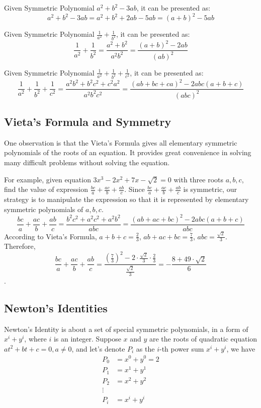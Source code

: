 \documentclass[11pt, oneside]{article}   	%
\begin{document}
Given Symmetric Polynomial $a^2+b^2-3ab$, it can be presented as:
\[a^2+b^2-3ab = a^2+b^2+2ab-5ab=(a+b)^2-5ab\]

Given Symmetric Polynomial $\frac{1}{a^2}+\frac{1}{b^2}$, it can be presented as:
\[\frac{1}{a^2}+\frac{1}{b^2}=\frac{a^2+b^2}{a^2 b^2}=\frac{(a+b)^2-2ab}{(ab)^2}\] 

Given Symmetric Polynomial $\frac{1}{a^2}+\frac{1}{b^2}+\frac{1}{c^2}$, it can be presented as:
\[\frac{1}{a^2}+\frac{1}{b^2}+\frac{1}{c^2}=\frac{a^2b^2+b^2c^2+c^2a^2}{a^2 b^2c^2}=\frac{(ab+bc+ca)^2-2abc(a+b+c)}{(abc)^2}\] 

\subsection{Vieta's Formula and Symmetry} 
One observation is that the Vieta's Formula gives all elementary symmetric polynomials of the roots of an equation. It provides great convenience in solving many difficult problems without solving the equation. 

For example, given equation $3x^3-2x^2+7x-\sqrt{2}=0$ with three roots $a, b, c$, find the value of expression $\frac{bc}{a}+\frac{ac}{b}+\frac{ab}{c}$. Since $\frac{bc}{a}+\frac{ac}{b}+\frac{ab}{c}$ is symmetric, our strategy is to manipulate the expression so that it is represented by elementary symmetric polynomials of $a, b, c$. 
\[\frac{bc}{a}+\frac{ac}{b}+\frac{ab}{c} = \frac{b^2c^2+a^2c^2+a^2b^2}{abc}=\frac{(ab+ac+bc)^2-2abc(a+b+c)}{abc}\] 
According to Vieta's Formula, $a+b+c=\frac{2}{3}$, $ab+ac+bc=\frac{7}{3}$, $abc=\frac{\sqrt{2}}{3}$. 
Therefore, \[\frac{bc}{a}+\frac{ac}{b}+\frac{ab}{c} = \frac{(\frac{7}{3})^2-2\cdot\frac{\sqrt{2}}{3}\cdot\frac{2}{3}}{\frac{\sqrt{2}}{3}} = -\frac{8+49\cdot\sqrt{2}}{6}\].

\subsection{Newton's Identities} 
Newton's Identity is about a set of special symmetric polynomials, in a form of $x^i+y^i$, where $i$ is an integer. Suppose $x$ and $y$ are the roots of quadratic equation $at^2 + bt + c=0, a \ne 0$, and let's denote $P_i$ as the $i$-th power sum $x^i+y^i$, we have 
\begin{align*}
P_0 & =x^0+y^0=2\\
P_1 & =x^1+y^1 \\
P_2 & =x^2+y^2\\
\vdots \\
P_i & =x^i+y^i 
\end{align*}
\end{document}
